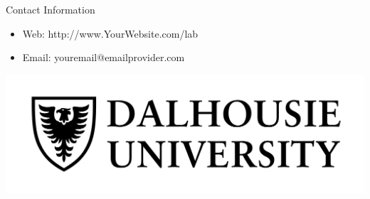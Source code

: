 \documentclass[final]{beamer}
\newlength{\onecolwid}
\begin{document}
\begin{frame}[t]
\begin{columns}[t]
\begin{column}{\onecolwid}
\begin{alertblock}{Contact Information}

\begin{itemize}
\item Web: http://www.YourWebsite.com/lab
\item Email: youremail@emailprovider.com
\end{itemize}

\end{alertblock}

\begin{center}
\includegraphics[width=0.8\linewidth]{source/dal_fullmark_blak.jpg}
\end{center}

\end{column} %

\end{columns} %

\end{frame} %
\end{document}
